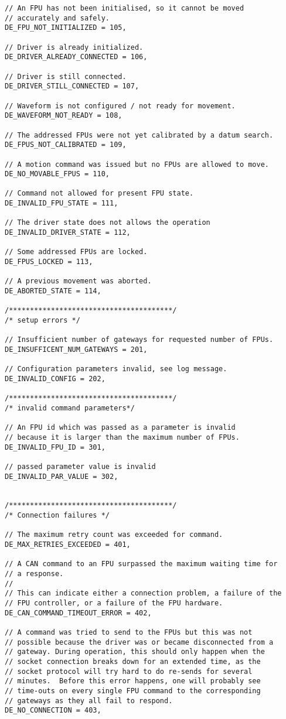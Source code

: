 \documentclass{scrartcl}[12pt,a4paper]
\begin{document}
\begin{verbatim}
// An FPU has not been initialised, so it cannot be moved
// accurately and safely.
DE_FPU_NOT_INITIALIZED = 105,

// Driver is already initialized.
DE_DRIVER_ALREADY_CONNECTED = 106,

// Driver is still connected.
DE_DRIVER_STILL_CONNECTED = 107,

// Waveform is not configured / not ready for movement.
DE_WAVEFORM_NOT_READY = 108,

// The addressed FPUs were not yet calibrated by a datum search.
DE_FPUS_NOT_CALIBRATED = 109,

// A motion command was issued but no FPUs are allowed to move.
DE_NO_MOVABLE_FPUS = 110,

// Command not allowed for present FPU state.
DE_INVALID_FPU_STATE = 111,

// The driver state does not allows the operation
DE_INVALID_DRIVER_STATE = 112,

// Some addressed FPUs are locked.
DE_FPUS_LOCKED = 113,

// A previous movement was aborted.
DE_ABORTED_STATE = 114,

/***************************************/
/* setup errors */

// Insufficient number of gateways for requested number of FPUs.
DE_INSUFFICENT_NUM_GATEWAYS = 201,

// Configuration parameters invalid, see log message.
DE_INVALID_CONFIG = 202,

/***************************************/
/* invalid command parameters*/

// An FPU id which was passed as a parameter is invalid
// because it is larger than the maximum number of FPUs.
DE_INVALID_FPU_ID = 301,

// passed parameter value is invalid
DE_INVALID_PAR_VALUE = 302,


/***************************************/
/* Connection failures */

// The maximum retry count was exceeded for command.
DE_MAX_RETRIES_EXCEEDED = 401,

// A CAN command to an FPU surpassed the maximum waiting time for
// a response.
//
// This can indicate either a connection problem, a failure of the
// FPU controller, or a failure of the FPU hardware.
DE_CAN_COMMAND_TIMEOUT_ERROR = 402,

// A command was tried to send to the FPUs but this was not
// possible because the driver was or became disconnected from a
// gateway. During operation, this should only happen when the
// socket connection breaks down for an extended time, as the
// socket protocol will try hard to do re-sends for several
// minutes.  Before this error happens, one will probably see
// time-outs on every single FPU command to the corresponding
// gateways as they all fail to respond.
DE_NO_CONNECTION = 403,



\end{verbatim}
\end{document}
